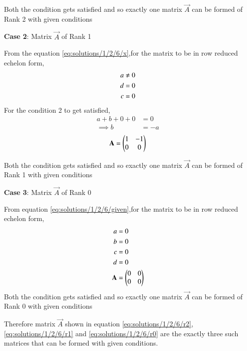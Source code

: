 Both the condition gets satisfied and so exactly one matrix $\vec{A}$ can be formed of Rank 2 with given conditions 

\textbf{Case 2}: Matrix $\vec{A}$ of Rank 1

From the equation \eqref{eq:solutions/1/2/6/x},for the matrix to be in row reduced echelon form,
\begin{align}
    a&\not=0\notag\\
    d&=0\notag\\
    c&=0\notag
\end{align}
For the condition 2 to get satisfied, 
\begin{align}
    a+b+0+0&=0\\
    \implies b&=-a
\end{align}
\begin{align}
    \mathbf{A}=\begin{pmatrix}1 & -1\\ 0 & 0\end{pmatrix}\label{eq:solutions/1/2/6/r1}
\end{align}

Both the condition gets satisfied and so exactly one matrix $\vec{A}$ can be formed of Rank 1 with given conditions 

\textbf{Case 3}: Matrix $\vec{A}$ of Rank 0

From equation \eqref{eq:solutions/1/2/6/given},for the matrix to be in row reduced echelon form,
\begin{align}
    a&=0\notag\\
    b&=0\notag\\
    c&=0\notag\\
    d&=0\notag\\
    \mathbf{A}&=\begin{pmatrix}0 & 0\\ 0 & 0\end{pmatrix}\label{eq:solutions/1/2/6/r0}
\end{align}
Both the condition gets satisfied and so exactly one matrix $\vec{A}$ can be formed of Rank 0 with given conditions 

Therefore matrix $\vec{A}$ shown in equation \eqref{eq:solutions/1/2/6/r2},\eqref{eq:solutions/1/2/6/r1} and \eqref{eq:solutions/1/2/6/r0} are the exactly three such matrices that can be formed with given conditions.

